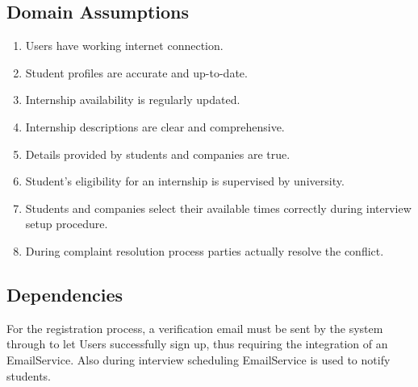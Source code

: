 \subsection{Domain Assumptions}
\begin{enumerate}[label=D{\arabic*}]
\item Users have working internet connection.
\item Student profiles are accurate and up-to-date.
\item Internship availability is regularly updated.
\item Internship descriptions are clear and comprehensive.
\item Details provided by students and companies are true.
\item Student's eligibility for an internship is supervised by university.
\item Students and companies select their available times correctly during interview setup procedure.
\item During complaint resolution process parties actually resolve the conflict.
\end{enumerate}

\subsection{Dependencies}

For the registration process, a verification email must be sent by the system through to let Users successfully
sign up, thus requiring the integration of an EmailService. Also during interview scheduling EmailService is used to notify students.



